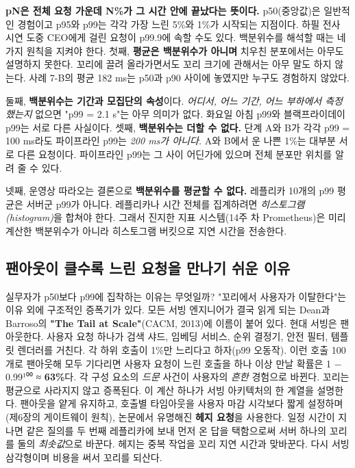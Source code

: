 \textbf{pN은 전체 요청 가운데 N\%가 그 시간 안에 끝났다는 뜻이다.} p50(중앙값)은 일반적인 경험이고 p95와 p99는 각각 가장 느린 5\%와 1\%가 시작되는 지점이다. 하필 전사 시연 도중 CEO에게 걸린 요청이 p99.9에 속할 수도 있다. 백분위수를 해석할 때는 네 가지 원칙을 지켜야 한다. 첫째, \textbf{평균은 백분위수가 아니며} 치우친 분포에서는 아무도 설명하지 못한다. 꼬리에 끌려 올라가면서도 꼬리 크기에 관해서는 아무 말도 하지 않는다. 사례 7-B의 평균 182 ms는 p50과 p90 사이에 놓였지만 누구도 경험하지 않았다.

둘째, \textbf{백분위수는 기간과 모집단의 속성}이다. \textit{어디서, 어느 기간, 어느 부하에서 측정했는지} 없으면 "p99 = 2.1 s"는 아무 의미가 없다. 화요일 아침 p99와 블랙프라이데이 p99는 서로 다른 사실이다. 셋째, \textbf{백분위수는 더할 수 없다.} 단계 A와 B가 각각 p99 = 100 ms라도 파이프라인 p99는 \textit{200 ms가 아니다.} A와 B에서 운 나쁜 1\%는 대부분 서로 다른 요청이다. 파이프라인 p99는 그 사이 어딘가에 있으며 전체 분포만 위치를 알려 줄 수 있다.

넷째, 운영상 따라오는 결론으로 \textbf{백분위수를 평균할 수 없다.} 레플리카 10개의 p99 평균은 서버군 p99가 아니다. 레플리카나 시간 전체를 집계하려면 \textit{히스토그램(histogram)}을 합쳐야 한다. 그래서 진지한 지표 시스템(14주 차 Prometheus)은 미리 계산한 백분위수가 아니라 히스토그램 버킷으로 지연 시간을 전송한다.

\subsection*{팬아웃이 클수록 느린 요청을 만나기 쉬운 이유}

실무자가 p50보다 p99에 집착하는 이유는 무엇일까? "꼬리에서 사용자가 이탈한다"는 이유 외에 구조적인 증폭기가 있다. 모든 서빙 엔지니어가 결국 읽게 되는 Dean과 Barroso의 \textbf{"The Tail at Scale"}(CACM, 2013)에 이름이 붙어 있다. 현대 서빙은 팬아웃한다. 사용자 요청 하나가 검색 샤드, 임베딩 서비스, 순위 결정기, 안전 필터, 템플릿 렌더러를 거친다. 각 하위 호출이 1\%만 느리다고 하자(p99 오동작). 이런 호출 100개로 팬아웃해 모두 기다리면 사용자 요청이 느린 호출을 하나 이상 만날 확률은 1 − 0.99¹⁰⁰ ≈ \textbf{63\%}다. 각 구성 요소의 \textit{드문} 사건이 사용자의 \textit{흔한} 경험으로 바뀐다. 꼬리는 평균으로 사라지지 않고 증폭된다. 이 계산 하나가 서빙 아키텍처의 한 계열을 설명한다. 팬아웃을 얕게 유지하고, 호출별 타임아웃을 사용자 마감 시각보다 짧게 설정하며(제6장의 게이트웨이 원칙), 논문에서 유명해진 \textbf{헤지 요청}을 사용한다. 일정 시간이 지나면 같은 질의를 두 번째 레플리카에 보내 먼저 온 답을 택함으로써 서버 하나의 꼬리를 둘의 \textit{최솟값}으로 바꾼다. 헤지는 중복 작업을 꼬리 지연 시간과 맞바꾼다. 다시 서빙 삼각형이며 비용을 써서 꼬리를 되산다.

